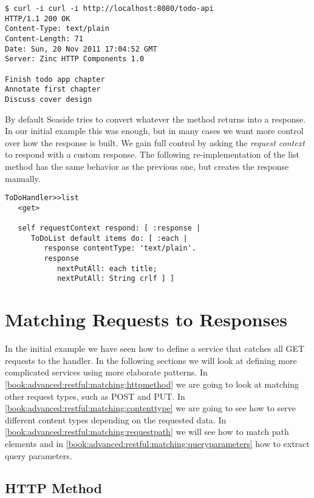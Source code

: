 \documentclass[a4paper,10pt,twoside]{book}
\newcommand{\ct}[1]{{\small\ttfamily\textup{#1}}}
\begin{document}
\begin{lstlisting}
$ curl -i curl -i http://localhost:8080/todo-api
HTTP/1.1 200 OK
Content-Type: text/plain
Content-Length: 71
Date: Sun, 20 Nov 2011 17:04:52 GMT
Server: Zinc HTTP Components 1.0

Finish todo app chapter
Annotate first chapter
Discuss cover design
\end{lstlisting}

  By default Seaside tries to convert whatever the method returns into a response. In our initial example this was enough, but in many cases we want more control over how the response is built. We gain full control by asking the \textit{request context} to respond with a custom response. The following re-implementation of the \ct{list} method has the same behavior as the previous one, but creates the response manually.

\begin{lstlisting}
ToDoHandler>>list
   <get>

   self requestContext respond: [ :response |
      ToDoList default items do: [ :each |
         response contentType: 'text/plain'.
         response
            nextPutAll: each title;
            nextPutAll: String crlf ] ]
\end{lstlisting}

\section{Matching Requests to Responses}
\label{book:advanced:restful:matching}

In the initial example we have seen how to define a service that catches all GET requests to the handler. In the following sections we will look at defining more complicated services using more elaborate patterns. In \autoref{book:advanced:restful:matching:httpmethod} we are going to look at matching other request types, such as POST and PUT. In \autoref{book:advanced:restful:matching:contenttype} we are going to see how to serve different content types depending on the requested data. In \autoref{book:advanced:restful:matching:requestpath} we will see how to match path elements and in \autoref{book:advanced:restful:matching:queryparameters} how to extract query parameters.

\subsection{HTTP Method}
\label{book:advanced:restful:matching:httpmethod}
\end{document}
